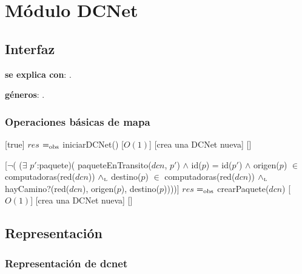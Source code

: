 \section{Módulo DCNet}

\subsection{Interfaz}

\textbf{se explica con}: .

\textbf{géneros}: .

\subsubsection{Operaciones básicas de mapa}

[true]
{$res$ $=_{\mathrm{obs}}$ iniciarDCNet()}
[$O(1)$]
[crea una DCNet nueva]
[]

[$\neg$( ($\exists$ $p'$:paquete)(	paqueteEnTransito($dcn$, $p'$) $\land$ 
									id($p$) = id($p'$) $\land$ 
									origen($p$) $\in$ computadoras(red($dcn$)) $\land_{\mathrm{\scriptscriptstyle{L}}}$ 
									destino($p$) $\in$ computadoras(red($dcn$)) $\land_{\mathrm{\scriptscriptstyle{L}}}$
									hayCamino?(red($dcn$), origen($p$), destino($p$))))]
{$res$ $=_{\mathrm{obs}}$ crearPaquete($dcn$)}
[$O(1)$]
[crea una DCNet nueva]
[]

\subsection{Representación}

\subsubsection{Representación de dcnet}

